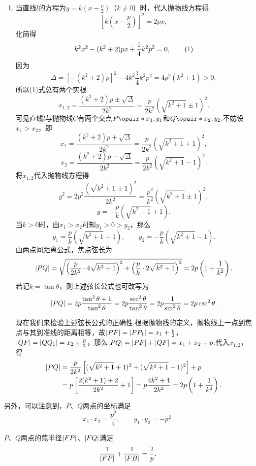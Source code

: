 \begin{example}
\begin{enumerate}
\item 当直线\(l\)的方程为\(y=k\left(x-\frac{p}{2}\right)\)（\(k\neq0\)）时，代入抛物线方程得\[
\left[k \left(x-\frac{p}{2}\right)\right]^2 = 2px,
\]化简得\begin{gather}
k^2 x^2 - (k^2 + 2)px + \frac{1}{4} k^2 p^2 = 0, \tag1
\end{gather}因为\[
\Delta = [- (k^2 + 2)p]^2 - 4 k^2 \frac{1}{4} k^2 p^2
= 4 p^2 (k^2 + 1) > 0,
\]所以(1)式总有两个实根\[
x_{1,2} = \frac{(k^2+2)p \pm \sqrt\Delta}{2 k^2}
= \frac{p}{2 k^2} (\sqrt{k^2+1} \pm 1)^2.
\]可见直线\(l\)与抛物线\(C\)有两个交点\(P\opair*{x_1,y_1}\)和\(Q\opair*{x_2,y_2}\).不妨设\(x_1 > x_2\)，即\[
x_1 = \frac{(k^2+2)p + \sqrt\Delta}{2 k^2}
= \frac{p}{2 k^2} (\sqrt{k^2+1} + 1)^2,
\]\[
x_2 = \frac{(k^2+2)p - \sqrt\Delta}{2 k^2}
= \frac{p}{2 k^2} (\sqrt{k^2+1} - 1)^2.
\]将\(x_{1,2}\)代入抛物线方程得\[
y^2 = 2 p^2 \frac{(\sqrt{k^2+1}\pm1)^2}{2 k^2}
= \frac{p^2}{k^2} (\sqrt{k^2+1}\pm1)^2,
\]\[
y = \pm \frac{p}{k} (\sqrt{k^2+1}\pm1).
\]当\(k>0\)时，由\(x_1 > x_2\)可知\(y_1 > 0 > y_2\)，那么\[
y_1 = \frac{p}{k} (\sqrt{k^2+1}+1),
\qquad
y_2 = -\frac{p}{k} (\sqrt{k^2+1}-1).
\]
由两点间距离公式，焦点弦长为\begin{equation}
\abs{PQ} = \sqrt{
\left(\frac{p}{2 k^2} \cdot 4 \sqrt{k^2+1}\right)^2
+\left(\frac{p}{k} \cdot 2 \sqrt{k^2+1}\right)^2
} = 2p \left(1+\frac{1}{k^2}\right).
\end{equation}若记\(k=\tan\theta\)，则上述弦长公式也可改写为\begin{equation}
\abs{PQ} = 2p \frac{\tan^2\theta+1}{\tan^2\theta}
= 2p \frac{\sec^2\theta}{\tan^2\theta}
= 2p \frac{1}{\sin^2\theta}
= 2p \csc^2\theta.
\end{equation}

现在我们来检验上述弦长公式的正确性.根据抛物线的定义，抛物线上一点到焦点与其到准线的距离相等，故\(\abs{PF} = \abs{P P_1} = x_1 + \frac{p}{2}\)，\(\abs{QF} = \abs{Q Q_1} = x_2 + \frac{p}{2}\)，那么\(\abs{PQ} = \abs{PF}+\abs{QF} = x_1 + x_2 + p\).代入\(x_{1,2}\)，得\begin{align*}
\abs{PQ} &= \frac{p}{2 k^2} \left[(\sqrt{k^2+1} + 1)^2 + (\sqrt{k^2+1} - 1)^2\right] + p \\
&= p\left[\frac{2(k^2 + 1) + 2}{2 k^2} + 1\right]
= p \frac{4k^2 + 4}{2k^2}
= 2p \left(1+\frac{1}{k^2}\right).
\end{align*}
\end{enumerate}

另外，可以注意到，\(P\)、\(Q\)两点的坐标满足\begin{equation}
x_1 \cdot x_2 = \frac{p^2}{4},
\qquad
y_1 \cdot y_2 = -p^2.
\end{equation}

\(P\)、\(Q\)两点的焦半径\(\abs{FP}\)、\(\abs{FQ}\)满足\begin{equation}
\frac{1}{\abs{FP}} + \frac{1}{\abs{FB}}
= \frac{2}{p}.
\end{equation}
\end{example}



